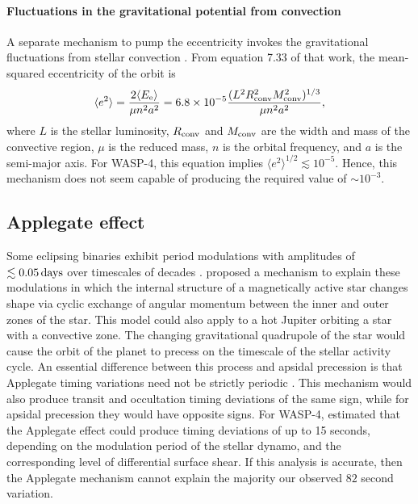 \documentclass[12pt,twocolumn,tighten]{aastex62}
\begin{document}
\paragraph{Fluctuations in the gravitational potential from convection}
A separate mechanism to pump the eccentricity invokes the
gravitational fluctuations from stellar convection \citep[][Section
7]{phinney_pulsars_1992}.  From equation 7.33 of that work, the
mean-squared eccentricity of the orbit is
\begin{equation}
  \langle e^2 \rangle =
  \frac{ 2 \langle E_{\rm e} \rangle }{\mu n^2 a^2}
  = 6.8\times10^{-5}
  \frac{(L^2 R_{\rm conv}^2 M_{\rm conv}^2)^{1/3}}{\mu n^2 a^2},
\end{equation}
where $L$ is the stellar luminosity, $R_{\rm conv}$ and $M_{\rm conv}$
are the width and mass of the convective region, $\mu$ is the reduced
mass, $n$ is the orbital frequency, and $a$ is the semi-major axis.
For WASP-4, this equation implies $\langle e^2 \rangle^{1/2} \lesssim
10^{-5}$.  Hence, this mechanism does not seem capable of producing
the required value of $\sim$$10^{-3}$.


\subsection{Applegate effect}

Some eclipsing binaries exhibit period modulations with amplitudes of
$\lesssim 0.05\,{\rm days}$ over timescales of decades \citep[{\it
    e.g.},][]{soderhjelm_geometry_1980,hall_relation_1989}.
\citet{applegate_mechanism_1992} proposed a mechanism to explain these
modulations in which the internal structure of a magnetically active
star changes shape via cyclic exchange of angular momentum between the
inner and outer zones of the star.  This model could also apply to a
hot Jupiter orbiting a star with a convective zone.  The changing
gravitational quadrupole of the star would cause the orbit of the
planet to precess on the timescale of the stellar activity cycle.  An
essential difference between this process and apsidal precession is
that Applegate timing variations need not be strictly periodic
\citep[{\it e.g.},][Figure~12]{soderhjelm_geometry_1980}. This
mechanism would also produce transit and occultation timing deviations
of the same sign, while for apsidal precession they would have
opposite signs.  For WASP-4, \citet{watson_orbital_2010} estimated
that the Applegate effect could produce timing deviations of up to 15
seconds, depending on the modulation period of the stellar dynamo, and
the corresponding level of differential surface shear.  If this
analysis is accurate, then the Applegate mechanism cannot explain the
majority our observed $82$ second variation.
\end{document}
